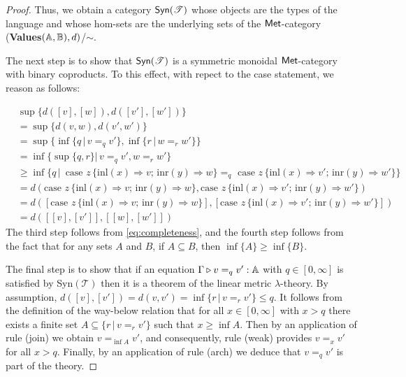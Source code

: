 \begin{proof}
  Thus, we obtain a category $\mathsf{Syn}(\mathscr{T})$ whose objects are the types of the language and whose hom-sets are the underlying sets of the  $\mathsf{Met}$-category (\textbf{Values}$(\mathbb{A},\mathbb{B}),d)$/$\sim$.


  The next step is to show that $\mathsf{Syn}(\mathscr{T})$ is a symmetric monoidal $\mathsf{Met}$-category with binary coproducts. To this effect, with repect to the case statement, we reason as follows:

  \begin{align*}
    & \sup{\{d([v],[w]),d([v'],[w']) \}}  \\
    & = \sup{\{d(v,w),d(v',w') \}} \\
    & = \sup {\{ \inf{\{q \, \vert \, v=_q v'\}},\inf{\{r \, \vert \, w=_r w'\}}  \}} \\
    & = \inf{\{ \sup \{ q, r \} \vert \, v=_q v', w=_r w' \}} &  \\
    & \geq  \inf{ \{ q  \,\vert \, \text{ case } z \,   \{\text{inl} (x) \Rightarrow v ; \, \text{inr} (y) \Rightarrow w\} =_{q} \text{ case } z \,  \{\text{inl} (x) \Rightarrow v' ; \,\text{inr} (y) \Rightarrow w'\} \} } &  \\ 
    & = d(\text{case } z \,   \{\text{inl} (x) \Rightarrow v ; \, \text{inr} (y) \Rightarrow w\}, \text{case } z \,  \{\text{inl} (x) \Rightarrow v' ; \,\text{inr} (y) \Rightarrow w'\}) \\
    & = d([\text{case } z \,   \{\text{inl} (x) \Rightarrow v ; \, \text{inr} (y) \Rightarrow w\}], [\text{case } z \,  \{\text{inl} (x) \Rightarrow v' ; \,\text{inr} (y) \Rightarrow w'\}]) \\
    & = d([[v],[v']],[[w],[w']])  
  \end{align*}
   The third step follows from \autoref{eq:completeness}, and the fourth step follows from the fact that for any sets $A$ and $B$, if $A \subseteq B$, then $\inf\{A\} \geq \inf\{B\}$.

  The final step is to show that if an equation $\Gamma \triangleright v =_q v' : \mathbb{A}$ with $q \in [0, \infty]$ is satisfied by Syn$(\mathscr{T})$ then it is a theorem of the linear metric $\lambda$-theory. By assumption, $d([v],[v']) = d(v,v') =  \inf{ \{r \, \vert \, v =_r v'\}} \leq q$. It follows from the definition of the way-below relation that for all
 $x \in [0, \infty]$ with $x>q$ there exists a finite set $A \subseteq \{r \, \vert \, v =_r v'\}$ such that $x \geq \inf{A}$. Then by an
 application of rule (join) we obtain $v =_{\inf{A}} v'$, and consequently, rule (weak) provides $v =_x v'$ for all $x > q$. Finally, by an application of rule (arch)  we deduce that $v =_q v'$ is part of the theory.
\end{proof}

